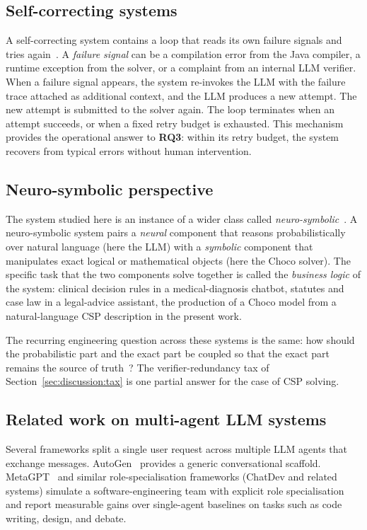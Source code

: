 \documentclass[11pt,a4paper]{article}
\newcommand{\rqthree}{\textbf{RQ3}}
\begin{document}
\subsection{Self-correcting systems}\label{sec:bg:refine}
A self-correcting system contains a loop that reads its own failure signals and tries again~\cite{R4}. A \emph{failure signal} can be a compilation error from the Java compiler, a runtime exception from the solver, or a complaint from an internal LLM verifier. When a failure signal appears, the system re-invokes the LLM with the failure trace attached as additional context, and the LLM produces a new attempt. The new attempt is submitted to the solver again. The loop terminates when an attempt succeeds, or when a fixed retry budget is exhausted. This mechanism provides the operational answer to \rqthree{}: within its retry budget, the system recovers from typical errors without human intervention.

\subsection{Neuro-symbolic perspective}\label{sec:bg:neurosymbolic}
The system studied here is an instance of a wider class called \emph{neuro-symbolic}~\cite{R7}. A neuro-symbolic system pairs a \emph{neural} component that reasons probabilistically over natural language (here the LLM) with a \emph{symbolic} component that manipulates exact logical or mathematical objects (here the Choco solver). The specific task that the two components solve together is called the \emph{business logic} of the system: clinical decision rules in a medical-diagnosis chatbot, statutes and case law in a legal-advice assistant, the production of a Choco model from a natural-language CSP description in the present work.

The recurring engineering question across these systems is the same: how should the probabilistic part and the exact part be coupled so that the exact part remains the source of truth~\cite{R8}? The verifier-redundancy tax of Section~\ref{sec:discussion:tax} is one partial answer for the case of CSP solving.


\subsection{Related work on multi-agent LLM systems}\label{sec:bg:related}
Several frameworks split a single user request across multiple LLM agents that exchange messages. AutoGen~\cite{R5} provides a generic conversational scaffold. MetaGPT~\cite{R6} and similar role-specialisation frameworks (ChatDev and related systems) simulate a software-engineering team with explicit role specialisation and report measurable gains over single-agent baselines on tasks such as code writing, design, and debate.
\end{document}
